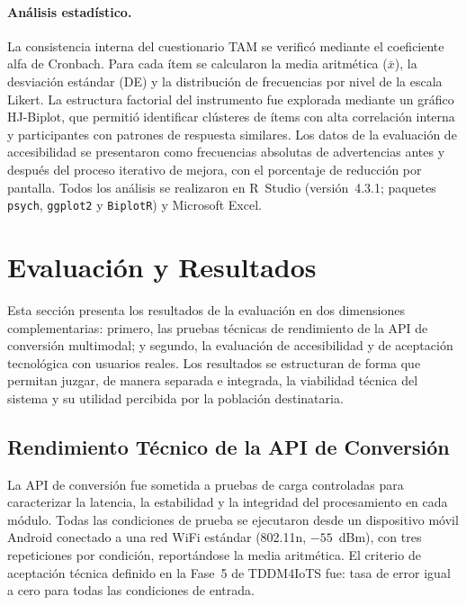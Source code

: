 \documentclass[journal]{IEEEtran}
\begin{document}
				\paragraph{An\'alisis estad\'istico.} La consistencia interna del cuestionario TAM se verific\'o mediante el coeficiente alfa de Cronbach. Para cada \'item se calcularon la media aritm\'etica ($\bar{x}$), la desviaci\'on est\'andar (DE) y la distribuci\'on de frecuencias por nivel de la escala Likert. La estructura factorial del instrumento fue explorada mediante un gr\'afico HJ-Biplot, que permiti\'o identificar cl\'usteres de \'items con alta correlaci\'on interna y participantes con patrones de respuesta similares. Los datos de la evaluaci\'on de accesibilidad se presentaron como frecuencias absolutas de advertencias antes y despu\'es del proceso iterativo de mejora, con el porcentaje de reducci\'on por pantalla. Todos los an\'alisis se realizaron en R~Studio (versi\'on~4.3.1; paquetes \texttt{psych}, \texttt{ggplot2} y \texttt{BiplotR}) y Microsoft Excel.
				
	
	\section{Evaluaci\'on y Resultados}
	\label{sec:evaluacion}
		Esta secci\'on presenta los resultados de la evaluaci\'on en dos dimensiones complementarias: primero, las pruebas t\'ecnicas de rendimiento de la API de conversi\'on multimodal; y segundo, la evaluaci\'on de accesibilidad y de aceptaci\'on tecnol\'ogica con usuarios reales. Los resultados se estructuran de forma que permitan juzgar, de manera separada e integrada, la viabilidad t\'ecnica del sistema y su utilidad percibida por la poblaci\'on destinataria.
	
		\subsection{Rendimiento T\'ecnico de la API de Conversi\'on}
			
			La API de conversi\'on fue sometida a pruebas de carga controladas para caracterizar la latencia, la estabilidad y la integridad del procesamiento en cada m\'odulo. Todas las condiciones de prueba se ejecutaron desde un dispositivo m\'ovil Android conectado a una red WiFi est\'andar (802.11n, $-55$~dBm), con tres repeticiones por condici\'on, report\'andose la media aritm\'etica. El criterio de aceptaci\'on t\'ecnica definido en la Fase~5 de TDDM4IoTS fue: tasa de error igual a cero para todas las condiciones de entrada.
			
\end{document}
